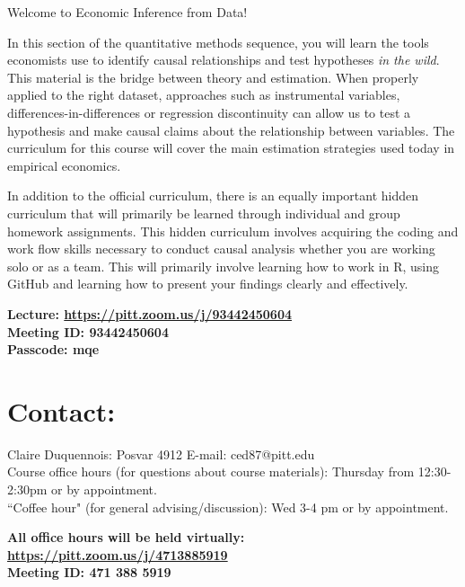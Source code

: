 \documentclass[a4paper, 10pt]{article}
\begin{document}
\begin{center}
Welcome to Economic Inference from Data!\\
\end{center}



In this section of the quantitative methods sequence, you will learn the tools economists use to identify causal relationships and test hypotheses \textit{in the wild}. This material is the bridge between theory and estimation. When properly applied to the right dataset, approaches such as instrumental variables, differences-in-differences or regression discontinuity can allow us to test a hypothesis and make causal claims about the relationship between variables. The curriculum for this course will cover the main estimation strategies used today in empirical economics. 

In addition to the official curriculum, there is an equally important hidden curriculum that will primarily be learned through individual and group homework assignments. This hidden curriculum involves acquiring the coding and work flow skills necessary to conduct causal analysis whether you are working solo or as a team. This will primarily involve learning how to work in R, using GitHub and learning how to present your findings clearly and effectively.



\noindent\textbf{Lecture: \href{ https://pitt.zoom.us/j/93442450604}{ https://pitt.zoom.us/j/93442450604}\\
Meeting ID:  93442450604\\
Passcode: mqe\\}


\section*{Contact:}


\normalsize \noindent Claire Duquennois: Posvar 4912  E-mail: ced87@pitt.edu\\
Course office hours (for questions about course materials): Thursday from 12:30-2:30pm or by appointment. \\
``Coffee hour" (for general advising/discussion): Wed 3-4 pm  or by appointment.

\noindent\textbf{All office hours will be held virtually: \href{https://pitt.zoom.us/j/4713885919}{https://pitt.zoom.us/j/4713885919}\\
Meeting ID: 471 388 5919\\}
\end{document}
